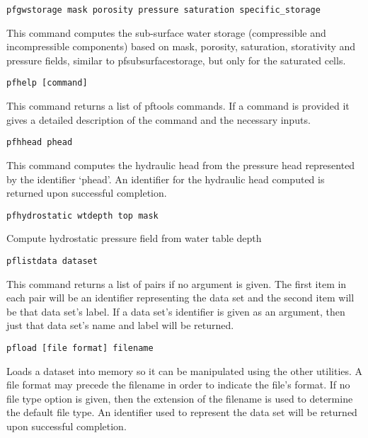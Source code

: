 \begin{description}
\item{\begin{verbatim}pfgwstorage mask porosity pressure saturation specific_storage\end{verbatim}}
This command computes the sub-surface water storage (compressible and incompressible components)
based on mask, porosity, saturation, storativity and pressure fields, similar to pfsubsurfacestorage,
but only for the saturated cells.

\item{\begin{verbatim}pfhelp [command]\end{verbatim}}
This command returns a list of pftools commands. If a command is provided it gives a detailed
description of the command and the necessary inputs.

\item{\begin{verbatim}pfhhead phead\end{verbatim}}
This command computes the hydraulic head from the pressure head
represented by the identifier `phead'.  An identifier for the
hydraulic head computed is returned upon successful completion.

\item{\begin{verbatim}pfhydrostatic wtdepth top mask\end{verbatim}}
Compute hydrostatic pressure field from water table depth

\item{\begin{verbatim}pflistdata dataset\end{verbatim}}
This command returns a list of pairs if no argument is given.  The
first item in each pair will be an identifier representing the data
set and the second item will be that data set's label.  If a data
set's identifier is given as an argument, then just that data set's
name and label will be returned.


\item{\begin{verbatim}pfload [file format] filename\end{verbatim}}
Loads a dataset into memory so it can be manipulated using the other
utilities.  A file format may precede the filename in order to
indicate the file's format.  If no file type option is given, then the
extension of the filename is used to determine the default file type.
An identifier used to represent the data set will be returned upon
successful completion.


\end{description}
